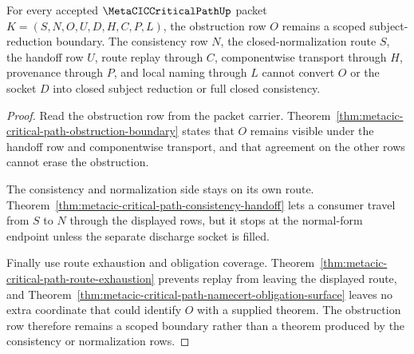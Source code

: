 \begin{theorem}
\label{thm:metacic-critical-path-obstruction-scope-separation}
For every accepted $\MetaCICCriticalPathUp$ packet $K=(S,N,O,U,D,H,C,P,L)$, the obstruction row $O$ remains a scoped subject-reduction boundary. The consistency row $N$, the closed-normalization route $S$, the handoff row $U$, route replay through $C$, componentwise transport through $H$, provenance through $P$, and local naming through $L$ cannot convert $O$ or the socket $D$ into closed subject reduction or full closed consistency.
\end{theorem}
\begin{proof}
Read the obstruction row from the packet carrier. Theorem~\ref{thm:metacic-critical-path-obstruction-boundary} states that $O$ remains visible under the handoff row and componentwise transport, and that agreement on the other rows cannot erase the obstruction.

The consistency and normalization side stays on its own route. Theorem~\ref{thm:metacic-critical-path-consistency-handoff} lets a consumer travel from $S$ to $N$ through the displayed rows, but it stops at the normal-form endpoint unless the separate discharge socket is filled.

Finally use route exhaustion and obligation coverage. Theorem~\ref{thm:metacic-critical-path-route-exhaustion} prevents replay from leaving the displayed route, and Theorem~\ref{thm:metacic-critical-path-namecert-obligation-surface} leaves no extra coordinate that could identify $O$ with a supplied theorem. The obstruction row therefore remains a scoped boundary rather than a theorem produced by the consistency or normalization rows.
\end{proof}

